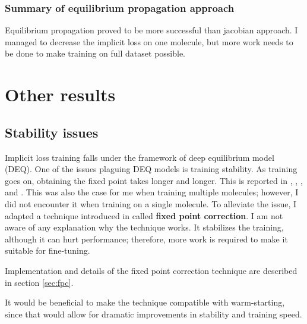 \documentclass[a4paper,10pt]{report}
\begin{document}
\subsubsection{Summary of equilibrium propagation approach}
Equilibrium propagation proved to be more successful than jacobian approach. I managed to decrease the implicit loss on one molecule, but more work needs to be done to make training on full dataset possible.
\section{Other results}

\subsection{Stability issues}
Implicit loss training falls under the framework of deep equilibrium model (DEQ). One of the issues plaguing DEQ models is training stability. As training goes on, obtaining the fixed point takes longer and longer. This is reported in \cite{opticalflow}, \cite{bai2021stabilizing}, \cite{burger2025dequify}, and \cite{geng2023torchdeq}. This was also the case for me when training multiple molecules; however, I did not encounter it when training on a single molecule. To alleviate the issue, I adapted a technique introduced in \cite{opticalflow} called \textbf{fixed point correction}. I am not aware of any explanation why the technique works. It stabilizes the training, although it can hurt performance; therefore, more work is required to make it suitable for fine-tuning.

Implementation and details of the fixed point correction technique are described in section \ref{sec:fpc}.

It would be beneficial to make the technique compatible with warm-starting, since that would allow for dramatic improvements in stability and training speed.
\end{document}

